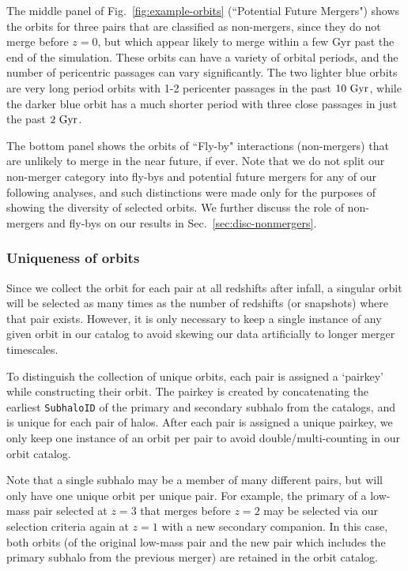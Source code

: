 \documentclass[twocolumn,linenumbers]{aastex631}
\begin{document}
The middle panel of Fig.~\ref{fig:example-orbits} (``Potential Future Mergers") shows the orbits for three pairs that are classified as non-mergers, since they do not merge before $z=0$, but which appear likely to merge within a few Gyr past the end of the simulation. 
These orbits can have a variety of orbital periods, and the number of pericentric passages can vary significantly. 
The two lighter blue orbits are very long period orbits with 1-2 pericenter passages in the past $10\,\mathrm{\,Gyr}$, while the darker blue orbit has a much shorter period with three close passages in just the past $2\,\mathrm{\,Gyr}$.

The bottom panel shows the orbits of ``Fly-by" interactions (non-mergers) that are unlikely to merge in the near future, if ever.  
Note that we do not split our non-merger category into fly-bys and potential future mergers for any of our following analyses, and such distinctions were made only for the purposes of showing the diversity of selected orbits. We further discuss the role of non-mergers and fly-bys on our results in Sec.~\ref{sec:disc-nonmergers}.


\subsubsection{Uniqueness of orbits}
\label{sec:methods-unique}
Since we collect the orbit for each pair at all redshifts after infall, a singular orbit will be selected as many times as the number of redshifts (or snapshots) where that pair exists. However, it is only necessary to keep a single instance of any given orbit in our catalog to avoid skewing our data artificially to longer merger timescales.

To distinguish the collection of unique orbits, each pair is assigned a `pairkey' while constructing their orbit. 
The pairkey is created by concatenating the earliest \texttt{SubhaloID} of the primary and secondary subhalo from the \sublink{} catalogs, and is unique for each pair of halos. 
After each pair is assigned a unique pairkey, we only keep one instance of an orbit per pair to avoid double/multi-counting in our orbit catalog.

Note that a single subhalo may be a member of many different pairs, but will only have one unique orbit per unique pair.
For example, the primary of a low-mass pair selected at $z=3$ that merges before $z=2$ may be selected via our selection criteria again at $z=1$ with a new secondary companion. 
In this case, both orbits (of the original low-mass pair and the new pair which includes the primary subhalo from the previous merger) are retained in the orbit catalog.%
\end{document}
